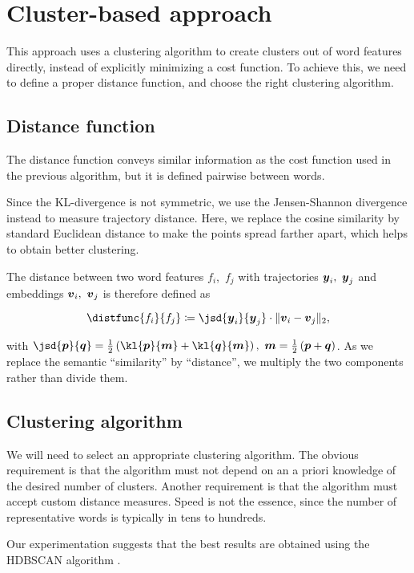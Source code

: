 \section{Cluster-based approach}
This approach uses a clustering algorithm to create clusters out of word features directly, instead of explicitly minimizing a cost function. To achieve this, we need to define a proper distance function, and choose the right clustering algorithm.

\subsection{Distance function}
The distance function conveys similar information as the cost function used in the previous algorithm, but it is defined pairwise between words.

Since the KL-divergence is not symmetric, we use the Jensen-Shannon divergence instead to measure trajectory distance. Here, we replace the cosine similarity by standard Euclidean distance to make the points spread farther apart, which helps to obtain better clustering.

The distance between two word features $f_{i}$,\ $f_{j}$ with trajectories $\vect{\traj}_{i},\ \vect{\traj}_{j}$ and embeddings $\embed_{i},\ \embed_{j}$ is therefore defined as

\begin{equation}
	\distfunc{f_{i}}{f_{j}} \coloneqq \jsd{\vect{\traj}_{i}}{\vect{\traj}_{j}} \cdot \| \embed_{i} - \embed_{j}\|_{2},
\end{equation}

with $\jsd{\vect{p}}{\vect{q}} = \frac{1}{2} \left( \kl{\vect{p}}{\vect{m}} + \kl{\vect{q}}{\vect{m}} \right) ,\ \vect{m} = \frac{1}{2} \left( \vect{p} + \vect{q} \right)$. As we replace the semantic ``similarity'' by ``distance'', we multiply the two components rather than divide them.


\subsection{Clustering algorithm}
We will need to select an appropriate clustering algorithm. The obvious requirement is that the algorithm must not depend on an a priori knowledge of the desired number of clusters. Another requirement is that the algorithm must accept custom distance measures. Speed is not the essence, since the number of representative words is typically in tens to hundreds.

Our experimentation suggests that the best results are obtained using the HDBSCAN algorithm \cite{hdbscan}.

